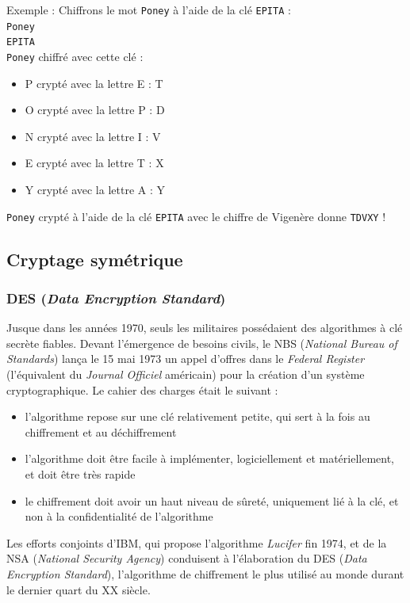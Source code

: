 \documentclass[a4paper,12pt]{article}
\begin{document}
Exemple : Chiffrons le mot \texttt{Poney} à l'aide de la clé \texttt{EPITA} :\\
\texttt{Poney}\\
\texttt{EPITA}\\
\texttt{Poney} chiffré avec cette clé :
\begin{itemize}
\item P crypté avec la lettre E : T
\item O crypté avec la lettre P : D
\item N crypté avec la lettre I : V
\item E crypté avec la lettre T : X
\item Y crypté avec la lettre A : Y
\end{itemize}
\texttt{Poney} crypté à l'aide de la clé \texttt{EPITA} avec le chiffre de Vigenère donne \texttt{TDVXY} !

\subsection{Cryptage symétrique}

\subsubsection{DES (\emph{Data Encryption Standard})}

Jusque dans les années 1970, seuls les militaires possédaient des algorithmes à clé secrète fiables. Devant l'émergence de besoins civils, le NBS (\emph{National Bureau of Standards}) lança le 15 mai 1973 un appel d'offres dans le \emph{Federal Register} (l'équivalent du \emph{Journal Officiel} américain) pour la création d'un système cryptographique. Le cahier des charges était le suivant :

\begin{itemize}
\item l'algorithme repose sur une clé relativement petite, qui sert à la fois au chiffrement et au déchiffrement
\item l'algorithme doit être facile à implémenter, logiciellement et matériel\-lement, et doit être très rapide
\item le chiffrement doit avoir un haut niveau de sûreté, uniquement lié à la clé, et non à la confidentialité de l'algorithme
\end{itemize}

Les efforts conjoints d'IBM, qui propose l'algorithme \emph{Lucifer} fin 1974, et de la NSA (\emph{National Security Agency}) conduisent à l'élaboration du DES (\emph{Data Encryption Standard}), l'algorithme de chiffrement le plus utilisé au monde durant le dernier quart du XX\ieme{} siècle.
\end{document}
